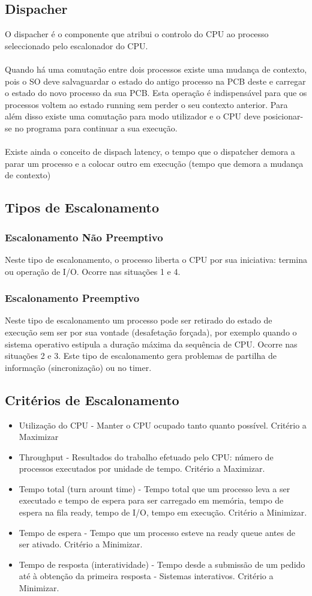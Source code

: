 \documentclass[10pt,a4paper]{report}
\begin{document}
\subsection{Dispacher}
O dispacher é o componente que atribui o controlo do CPU ao processo seleccionado pelo escalonador do CPU.\\
\\
Quando há uma comutação entre dois processos existe uma mudança de contexto, pois o SO deve salvaguardar o estado do antigo processo na PCB deste e carregar o estado do novo processo da sua PCB. Esta operação é indispensável para que os processos voltem ao estado running sem perder o seu contexto anterior. Para além disso existe uma comutação para modo utilizador e o CPU deve posicionar-se no programa para continuar a sua execução.\\
\\
Existe ainda o conceito de dispach latency, o tempo que o dispatcher demora a parar um processo e a colocar outro
em execução (tempo que demora a mudança de contexto)
\subsection{Tipos de Escalonamento}
\subsubsection{Escalonamento Não Preemptivo}
Neste tipo de escalonamento, o processo liberta o CPU por sua iniciativa: termina ou operação de I/O. Ocorre nas situações 1 e 4.
\subsubsection{Escalonamento Preemptivo}
Neste tipo de escalonamento um processo pode ser retirado do estado de execução sem ser por sua vontade (desafetação forçada), por exemplo quando o sistema operativo estipula a duração máxima da sequência de CPU. Ocorre nas situações 2 e 3.
Este tipo de escalonamento gera problemas de partilha de informação (sincronização) ou no timer.
\subsection{Critérios de Escalonamento}
\begin{itemize}
\item Utilização do CPU - Manter o CPU ocupado tanto quanto possível. Critério a Maximizar
\item Throughput - Resultados do trabalho efetuado pelo CPU: número de processos executados por unidade de tempo. Critério a Maximizar.
\item Tempo total (turn arount time) - Tempo total que um processo leva a ser executado e tempo de espera para ser carregado em memória, tempo de espera na fila ready, tempo de I/O, tempo em execução. Critério a Minimizar.
\item Tempo de espera - Tempo que um processo esteve na ready queue antes de ser ativado. Critério a Minimizar.
\item Tempo de resposta (interatividade) - Tempo desde a submissão de um pedido até à obtenção da primeira resposta - Sistemas interativos. Critério a Minimizar.
\end{itemize}
\end{document}
